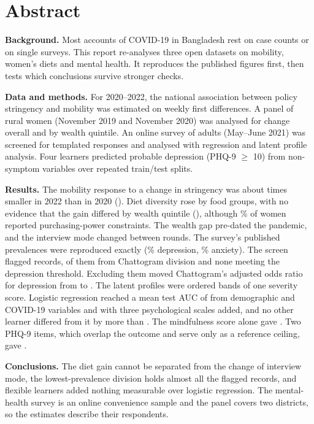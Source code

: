 \chapter*{Abstract}
\noindent\textbf{Background.} Most accounts of COVID-19 in Bangladesh rest on case counts or on single surveys. This report re-analyses three open datasets on mobility, women's diets and mental health. It reproduces the published figures first, then tests which conclusions survive stronger checks.

\noindent\textbf{Data and methods.} For 2020--2022, the national association between policy stringency and mobility was estimated on weekly first differences. A panel of \PanN{} rural women (November 2019 and November 2020) was analysed for change overall and by wealth quintile. An online survey of \MhN{} adults (May--June 2021) was screened for templated responses and analysed with regression and latent profile analysis. Four learners predicted probable depression (PHQ-9 $\geq$ 10) from non-symptom variables over \RepN{} repeated train/test splits.

\noindent\textbf{Results.} The mobility response to a change in stringency was about \PolRatio{} times smaller in 2022 than in 2020 (\PolIntCp). Diet diversity rose by \PanFgDiff{} food groups, with no evidence that the gain differed by wealth quintile (\PanChgP), although \PanPPP\% of women reported purchasing-power constraints. The wealth gap pre-dated the pandemic, and the interview mode changed between rounds. The survey's published prevalences were reproduced exactly (\PrevDep\% depression, \PrevAnx\% anxiety). The screen flagged \SuspectN{} records, \SuspectChatto{} of them from Chattogram division and none meeting the depression threshold. Excluding them moved Chattogram's adjusted odds ratio for depression from \SensChattoAll{} to \SensChattoExcl. The \GmmK{} latent profiles were ordered bands of one severity score. Logistic regression reached a mean test AUC of \RepAucALogit{} from demographic and COVID-19 variables and \RepAucBLogit{} with three psychological scales added, and no other learner differed from it by more than \RepMaxAbsDiff. The mindfulness score alone gave \AblMind. Two PHQ-9 items, which overlap the outcome and serve only as a reference ceiling, gave \AblPhqTwo.

\noindent\textbf{Conclusions.} The diet gain cannot be separated from the change of interview mode, the lowest-prevalence division holds almost all the flagged records, and flexible learners added nothing measurable over logistic regression. The mental-health survey is an online convenience sample and the panel covers two districts, so the estimates describe their respondents.

